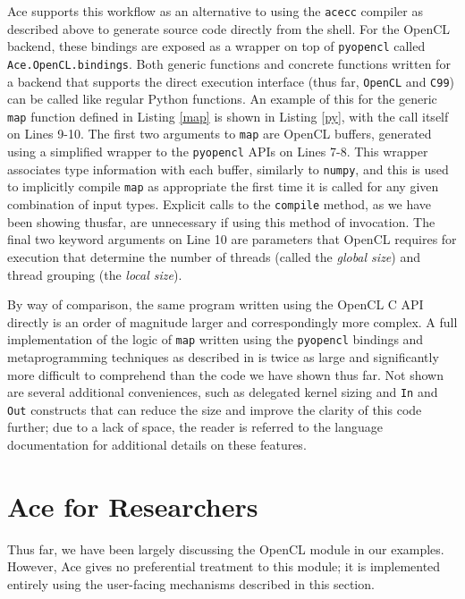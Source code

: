 \documentclass[10pt, conference, compsocconf]{IEEEtran}
\begin{document}
Ace supports this workflow as an alternative to using the \verb|acecc| compiler as described above to generate  source code directly from the shell. For the OpenCL backend, these bindings are exposed as a wrapper on top of \verb|pyopencl| called \verb|Ace.OpenCL.bindings|. Both generic functions and concrete functions written for a backend that supports the direct execution interface (thus far, \verb|OpenCL| and \verb|C99|) can be called like regular Python functions. An example of this for the generic \verb|map| function defined in Listing \ref{map} is shown in Listing \ref{py}, with the call itself on Lines 9-10. The first two arguments to \verb|map| are OpenCL buffers, generated using a simplified wrapper to the \verb|pyopencl| APIs on Lines 7-8. This wrapper associates type information with each buffer, similarly to \verb|numpy|, and this is used to implicitly compile \verb|map| as appropriate the first time it is called for any given combination of input types. Explicit calls to the \verb|compile| method, as we have been showing thusfar, are unnecessary if using this method of invocation. The final two keyword arguments on Line 10 are parameters that OpenCL requires for execution that determine the number of threads (called the {\em global size}) and thread grouping (the {\em local size}). 

By way of comparison, the same program written using the OpenCL C API directly is an order of magnitude larger and correspondingly more complex. A full implementation of the logic of \verb|map| written using the \verb|pyopencl| bindings and metaprogramming techniques as described in \cite{pyopencl} is twice as large and significantly more difficult to comprehend than the code we have shown thus far. Not shown are several additional conveniences, such as delegated kernel sizing and \verb|In| and \verb|Out| constructs that can reduce the size and improve the clarity of this code further; due to a lack of space, the reader is referred to the language documentation for additional details on these features.

\section{Ace for Researchers}
Thus far, we have been largely discussing the OpenCL module in our examples. However, Ace gives no preferential treatment to this module; it is implemented entirely using the user-facing mechanisms described in this section.
\end{document}
